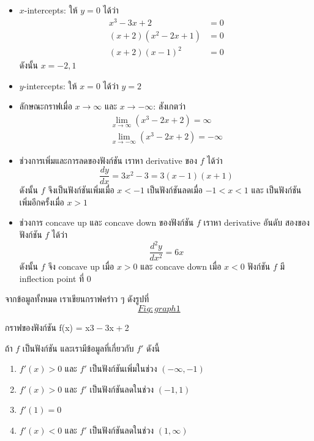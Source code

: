 \documentclass[
]{book}
\begin{document}
\begin{itemize}
\item
  \(x\)-intercepts: ให้ \(y=0\) ได้ว่า \begin{equation}   \begin{aligned}
      x^3-3x+2 &= 0 \\
      (x+2)(x^2-2x+1) &= 0 \\
      (x+2)(x-1)^2 &= 0
    \end{aligned} \end{equation} ดังนั้น \(x=-2, 1\)
\item
  \(y\)-intercepts: ให้ \(x=0\) ได้ว่า \(y=2\)
\item
  ลักษณะกราฟเมื่อ \(x \to \infty\) และ \(x \to -\infty\): สังเกตว่า
  \begin{equation}   \begin{aligned}
      \lim_{x\to \infty} (x^3-2x+2) = \infty \\
      \lim_{x\to -\infty} (x^3-2x+2) = -\infty
    \end{aligned} \end{equation}
\item
  ช่วงการเพิ่มและการลดของฟังก์ชัน เราหา derivative ของ \(f\) ได้ว่า
  \[\frac{dy}{dx} = 3x^2-3 = 3(x-1)(x+1)\] ดังนั้น \(f\) จึงเป็นฟังก์ชันเพิ่มเมื่อ
  \(x < -1\) เป็นฟังก์ชันลดเมื่อ \(-1 < x < 1\) และ เป็นฟังก์ชันเพิ่มอีกครั้งเมื่อ
  \(x>1\)
\item
  ช่วงการ concave up และ concave down ของฟังก์ชัน \(f\) เราหา derivative
  อันดับ สองของฟังก์ชัน \(f\) ได้ว่า \[\frac{d^2y}{dx^2} = 6x\] ดังนั้น \(f\) จึง
  concave up เมื่อ \(x>0\) และ concave down เมื่อ \(x<0\) ฟังก์ชัน \(f\) มี
  inflection point ที่ \(0\)
\end{itemize}

จากข้อมูลทั้งหมด เราเขียนกราฟคร่าว ๆ
ดังรูปที่~\hyperref[Fig:graph1]{\[Fig:graph1\]}

กราฟของฟังก์ชัน {f(x) = x3 − 3x + 2}

ถ้า \(f\) เป็นฟังก์ชัน และเรามีข้อมูลที่เกี่ยวกับ \(f'\) ดังนี้

\begin{enumerate}
\def\labelenumi{\arabic{enumi}.}
\item
  \(f'(x) > 0\) และ \(f'\) เป็นฟังก์ชันเพิ่มในช่วง \((-\infty, -1)\)
\item
  \(f'(x) > 0\) และ \(f'\) เป็นฟังก์ชันลดในช่วง \((-1,1)\)
\item
  \(f'(1) = 0\)
\item
  \(f'(x) < 0\) และ \(f'\) เป็นฟังก์ชันลดในช่วง \((1,\infty)\)
\end{enumerate}
\end{document}
